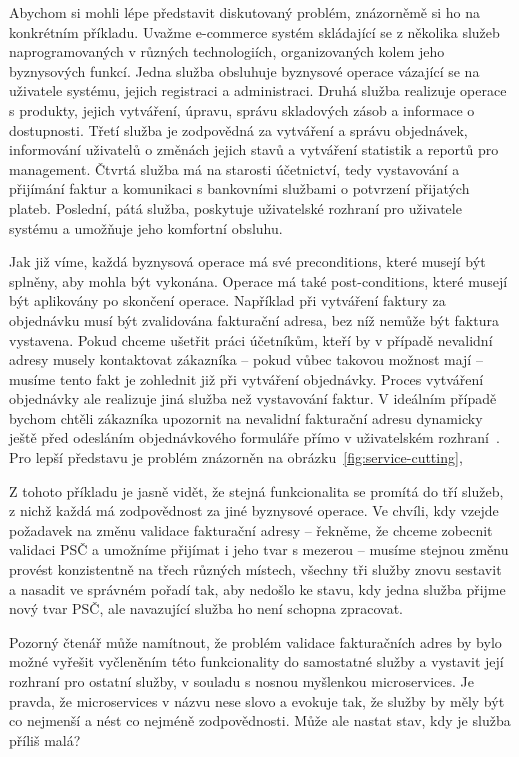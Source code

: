 Abychom si mohli lépe představit diskutovaný problém, znázorněmě
si ho na konkrétním příkladu. Uvažme e-commerce systém
skládající se z několika služeb naprogramovaných v různých technologiích,
organizovaných kolem jeho byznysových funkcí.
Jedna služba obsluhuje byznysové operace vázající
se na uživatele systému, jejich registraci a administraci. Druhá
služba realizuje operace s produkty, jejich vytváření, úpravu,
správu skladových zásob a informace o dostupnosti. Třetí služba je
zodpovědná za vytváření a správu objednávek, informování uživatelů
o změnách jejich stavů a vytváření statistik a reportů pro management.
Čtvrtá služba má na starosti účetnictví, tedy vystavování a přijímání
faktur a komunikaci s bankovními službami o potvrzení přijatých plateb.
Poslední, pátá služba, poskytuje uživatelské rozhraní pro uživatele
systému a umožňuje jeho komfortní obsluhu.

Jak již víme, každá byznysová operace má své preconditions, které musejí být splněny,
aby mohla být vykonána. Operace má také post-conditions, které musejí být
aplikovány po skončení operace. Například při vytváření faktury za
objednávku musí být zvalidována fakturační adresa, bez níž nemůže
být faktura vystavena. Pokud chceme ušetřit práci účetníkům, kteří by
v případě nevalidní adresy musely kontaktovat zákazníka – pokud vůbec
takovou možnost mají – musíme tento fakt je zohlednit již při vytváření objednávky.
Proces vytváření objednávky ale realizuje jiná služba než vystavování faktur.
V ideálním případě bychom chtěli zákazníka upozornit na nevalidní fakturační
adresu dynamicky ještě před odesláním objednávkového formuláře přímo v uživatelském
rozhraní~\cite{cemus2017separation}. Pro lepší představu je problém znázorněn na
obrázku~\ref{fig:service-cutting},

Z tohoto příkladu je jasně vidět, že stejná funkcionalita se promítá
do tří služeb, z nichž každá má zodpovědnost za jiné byznysové operace. Ve chvíli,
kdy vzejde požadavek na změnu validace fakturační adresy – řekněme, že chceme zobecnit
validaci PSČ a umožníme přijímat i jeho tvar s mezerou – musíme stejnou změnu
provést konzistentně na třech různých místech, všechny tři služby znovu
sestavit a nasadit ve správném pořadí tak, aby nedošlo ke stavu,
kdy jedna služba přijme nový tvar PSČ, ale navazující služba ho není
schopna zpracovat.

Pozorný čtenář může namítnout, že problém validace fakturačních adres by
bylo možné vyřešit vyčleněním této funkcionality
do samostatné služby a vystavit její rozhraní pro ostatní služby,
v souladu s nosnou myšlenkou microservices. Je pravda, že microservices
v názvu nese slovo  a evokuje tak, že služby by měly být co nejmenší
a nést co nejméně zodpovědnosti. Může ale nastat stav, kdy je služba příliš malá?

